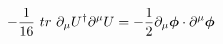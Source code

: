 \begin{equation}
-\frac{1}{16}~ tr~\partial_{\mu} U^\dag \partial^{\mu} U = -\frac{1}{2} \partial_{\mu} \mbox{\boldmath$\phi$}\cdot \partial^{\mu} \mbox{\boldmath$\phi$} 
\end{equation}

